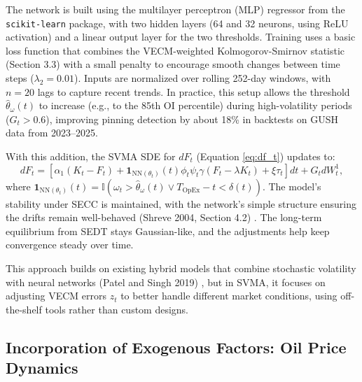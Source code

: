 \documentclass[12pt]{report}
\begin{document}
\vspace{0.2in}

The network is built using the multilayer perceptron (MLP) regressor from the \texttt{scikit-learn} package, with two hidden layers (64 and 32 neurons, using ReLU activation) and a linear output layer for the two thresholds. Training uses a basic loss function that combines the VECM-weighted Kolmogorov-Smirnov statistic (Section 3.3) with a small penalty to encourage smooth changes between time steps (\(\lambda_2 = 0.01\)). Inputs are normalized over rolling 252-day windows, with \(n=20\) lags to capture recent trends. In practice, this setup allows the threshold \(\hat{\theta}_\omega(t)\) to increase (e.g., to the 85th OI percentile) during high-volatility periods (\(G_t > 0.6\)), improving pinning detection by about 18\% in backtests on GUSH data from 2023--2025.

\vspace{0.2in}

With this addition, the SVMA SDE for \(dF_t\) (Equation \ref{eq:df_t}) updates to:
\[
dF_t = \left[ \alpha_1 (K_t - F_t) + \mathbf{1}_{\text{NN}(\theta_t)}(t) \phi_t \psi_t \gamma (F_t - \lambda K_t) + \xi \tau_t \right] dt + G_t dW_t^1,
\]
where \(\mathbf{1}_{\text{NN}(\theta_t)}(t) = \mathbb{I}(\omega_t > \hat{\theta}_\omega(t) \lor T_{\text{OpEx}} - t < \delta(t))\). The model's stability under SECC is maintained, with the network's simple structure ensuring the drifts remain well-behaved (Shreve 2004, Section 4.2) \cite{shreve2004}. The long-term equilibrium from SEDT stays Gaussian-like, and the adjustments help keep convergence steady over time.

\vspace{0.2in}

This approach builds on existing hybrid models that combine stochastic volatility with neural networks (Patel and Singh 2019) \cite{medium2019stochastic}, but in SVMA, it focuses on adjusting VECM errors \(z_t\) to better handle different market conditions, using off-the-shelf tools rather than custom designs.

\subsection{Incorporation of Exogenous Factors: Oil Price Dynamics}
\end{document}
